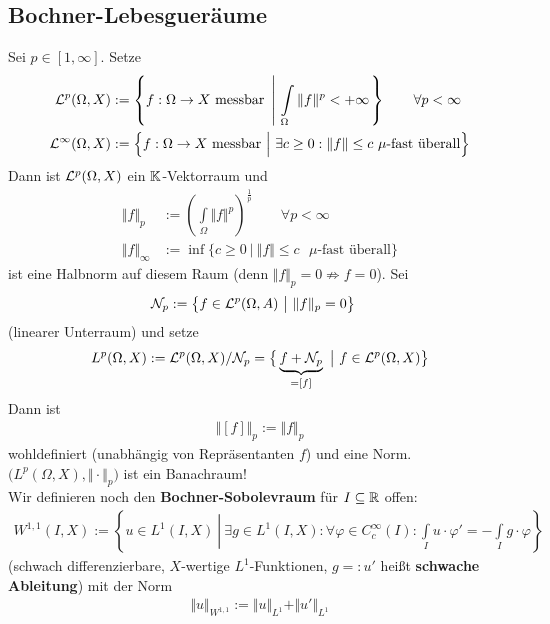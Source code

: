 \subsection*{Bochner-Lebesgueräume}
Sei $p\in[1,\infty]$. Setze
\begin{align*}
	\mathcal{L}^p(\Omega,X)&:=\left\lbrace f:\Omega\to X\text{ messbar }\left|~\int\limits_\Omega\Vert f\Vert^p<+\infty\right.\right\rbrace\qquad\forall p<\infty\\
	\mathcal{L}^\infty(\Omega,X)&:=\Big\lbrace f:\Omega\to X\text{ messbar }\Big|~\exists   c\geq0:\Vert f\Vert\leq c\text{ $\mu$-fast überall}\Big\rbrace
\end{align*}
Dann ist $\mathcal{L}^p(\Omega,X)$ ein $\mathbb{K}$-Vektorraum und 
\begin{align*}
	\Vert f\Vert_p&:=\left(\int\limits_\Omega\Vert f\Vert^p\right)^{\frac{1}{p}}\qquad\forall p<\infty\\
	\Vert f\Vert_\infty&:=\inf\limits\big\lbrace c\geq 0~\big|~\Vert f\Vert\leq c\text{ $\mu$-fast überall}\big\rbrace
\end{align*}
ist eine Halbnorm auf diesem Raum (denn $\Vert f\Vert_p=0\not\Rightarrow f=0$). 
Sei
\begin{align*}
	\mathcal{N}_p&:=\big\lbrace f\in \mathcal{L}^p(\Omega,A)~\big|~\Vert f\Vert_p=0\big\rbrace
\end{align*}
(linearer Unterraum) und setze
\begin{align*}
	L^p(\Omega,X):=\mathcal{L}^p(\Omega,X)/\mathcal{N}_p
	=\big\lbrace \underbrace{f+\mathcal{N}_p}_{=[f]}~\big|~f\in\mathcal{L}^p(\Omega,X)\big\rbrace
\end{align*}
Dann ist
\begin{align*}
	\big\Vert[f]\big\Vert_p:=\Vert f\Vert_p
\end{align*}
wohldefiniert (unabhängig von Repräsentanten $f$) und eine Norm. 
$\big(L^p(\Omega,X),\Vert\cdot\Vert_p\big)$ ist ein  Banachraum!\\
Wir definieren noch den \textbf{Bochner-Sobolevraum} für $I\subseteq\mathbb{R}$ offen:
\begin{align*}
	W^{1,1}(I,X):=\left\lbrace u\in L^1(I,X)~\left|~\exists g\in L^1(I,X):\forall\varphi\in C_c^\infty(I):\int\limits_I u\cdot\varphi'=-\int\limits_I g\cdot\varphi\right.\right\rbrace
\end{align*}
(schwach differenzierbare, $X$-wertige $L^1$-Funktionen, $g=:u'$ heißt \textbf{schwache Ableitung}) mit der Norm
\begin{align*}
	\Vert u\Vert_{W^{1,1}}:=\Vert u\Vert_{L^1}+\Vert u'\Vert_{L^1}
\end{align*}

